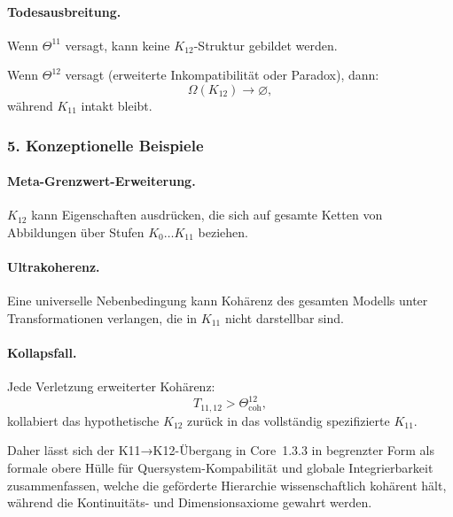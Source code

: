 \paragraph{Todesausbreitung.}
Wenn $\Theta^{11}$ versagt, kann keine $K_{12}$-Struktur gebildet werden.

Wenn $\Theta^{12}$ versagt (erweiterte Inkompatibilität oder Paradox), dann:
\[
\Omega(K_{12}) \rightarrow \varnothing,
\]
während $K_{11}$ intakt bleibt.

\subsubsection{5. Konzeptionelle Beispiele}

\paragraph{Meta-Grenzwert-Erweiterung.}
$K_{12}$ kann Eigenschaften ausdrücken, die sich auf gesamte Ketten von
Abbildungen über Stufen $K_0\dots K_{11}$ beziehen.

\paragraph{Ultrakoherenz.}
Eine universelle Nebenbedingung kann Kohärenz des gesamten Modells unter
Transformationen verlangen, die in $K_{11}$ nicht darstellbar sind.

\paragraph{Kollapsfall.}
Jede Verletzung erweiterter Kohärenz:
\[
T_{11,12} > \Theta^{12}_{\mathrm{coh}},
\]
kollabiert das hypothetische $K_{12}$ zurück in das vollständig spezifizierte
$K_{11}$.

Daher lässt sich der K11→K12-Übergang in Core~1.3.3 in begrenzter Form als formale
obere Hülle für Quersystem-Kompabilität und globale Integrierbarkeit zusammenfassen,
welche die geförderte Hierarchie wissenschaftlich kohärent hält, während die
Kontinuitäts- und Dimensionsaxiome gewahrt werden.
